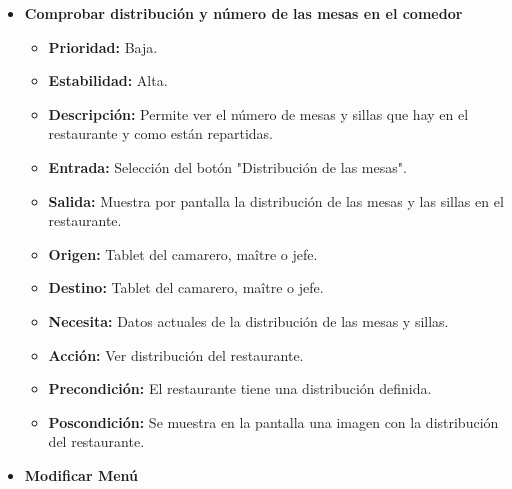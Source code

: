 \documentclass[spanish,a4paper,11pt, twoside]{report}	%
\begin{document}
\begin{itemize}
\begin{itemize}
		\end{itemize}%


		\item \textbf{Comprobar distribución y número de las mesas en el comedor} %

		\begin{itemize}
			\item \textbf{Prioridad: } Baja.
			\item \textbf{Estabilidad: } Alta.
			\item \textbf{Descripción: } Permite ver el número de mesas y sillas que hay en el restaurante y como están repartidas.
			\item \textbf{Entrada: } Selección del botón "Distribución de las mesas".
			\item \textbf{Salida: } Muestra por pantalla la distribución de las mesas y las sillas en el restaurante.
			\item \textbf{Origen: } Tablet del camarero, maître o jefe.
			\item \textbf{Destino: } Tablet del camarero, maître o jefe. 
			\item \textbf{Necesita: } Datos actuales de la distribución de las mesas y sillas.
			\item \textbf{Acción: } Ver distribución del restaurante.
			\item \textbf{Precondición: } El restaurante tiene una distribución definida.
			\item \textbf{Poscondición: } Se muestra en la pantalla una imagen con la distribución del restaurante.

		\end{itemize}%

		\item \textbf{Modificar Menú} %


\end{itemize}
\end{document}
